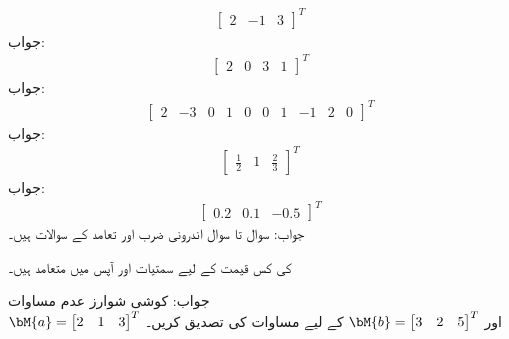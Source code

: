 \begin{align*}
\begin{bmatrix}2&-1&3  \end{bmatrix}^T
\end{align*}
جواب:
\begin{align*}
\begin{bmatrix}2&0&3&1  \end{bmatrix}^T
\end{align*}
جواب:
\begin{align*}
\begin{bmatrix}2&-3&0&1&0&0&1&-1&2&0 \end{bmatrix}^T
\end{align*}
جواب:
\begin{align*}
\begin{bmatrix}\tfrac{1}{2}&1&\tfrac{2}{3} \end{bmatrix}^T
\end{align*}
جواب:
\begin{align*}
\begin{bmatrix}0.2&0.1&-0.5 \end{bmatrix}^T
\end{align*}
جواب:
سوال  تا سوال  اندرونی ضرب اور تعامد  کے سوالات ہیں۔

 کی کس قیمت کے لیے  سمتیات  اور
  آپس میں متعامد ہیں۔

جواب:
\quad کوشی شوارز عدم مساوات\\
\begin{math}
\bM{a}=\begin{bmatrix}2&1&3\end{bmatrix}^T
\end{math}
اور
\begin{math}
\bM{b}=\begin{bmatrix}3&2&5\end{bmatrix}^T
\end{math}
کے لیے مساوات  کی تصدیق کریں۔

